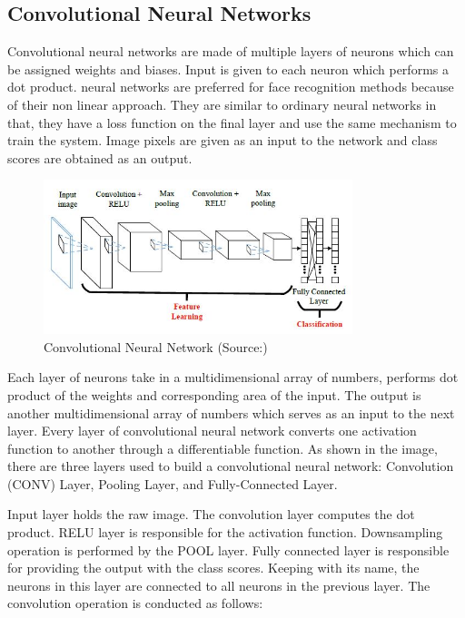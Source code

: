 \documentclass[conference]{IEEEtran}
\begin{document}
\subsection{Convolutional Neural Networks}
\label{subsec:3.3 Convolutional Neural Networks}
Convolutional neural networks are made of multiple layers of neurons which can be assigned weights and biases. Input is given to each neuron which performs a dot product. neural networks are preferred for face recognition methods because of their non linear approach. They are similar to ordinary neural networks in that, they have a loss function on the final layer and use the same mechanism to train the system. Image pixels are given as an input to the network and class scores are obtained as an output. 

\begin{figure}[h!]
 \centering
 \includegraphics[width = 9cm]{cnn_arch.JPG}
 \caption{ Convolutional Neural Network (Source:\cite{cheung2012convolutional})}
 \label{fig 5: Convolutional Neural Network}
\end{figure}

Each layer of neurons take in a multidimensional array of numbers, performs dot product of the weights and corresponding area of the input. The output is another multidimensional array of numbers which serves as an input to the next layer. Every layer of convolutional neural network converts one activation function to another through a differentiable function. As shown in the image, there are three layers used to build a convolutional neural network: Convolution (CONV) Layer, Pooling Layer, and Fully-Connected Layer.

Input layer holds the raw image. The convolution layer computes the dot product. RELU layer is responsible for the activation function. Downsampling operation is performed by the POOL layer. Fully connected layer is responsible for providing the output with the class scores. Keeping with its name, the neurons in this layer are connected to all neurons in the previous layer. The convolution operation is conducted as follows:
\end{document}
